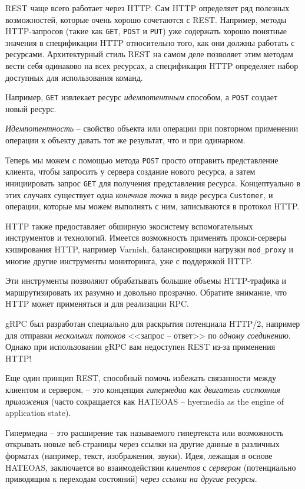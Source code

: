 \documentclass[%
	11pt,
	a4paper,
	utf8,
		]{article}
\begin{document}
REST чаще всего работает через HTTP. Сам HTTP определяет ряд полезных возможностей, которые очень хорошо сочетаются с REST. Например, методы HTTP-запросов (такие как \verb|GET|, \verb|POST| и \verb|PUT|) уже содержать хорошо понятные значения в спецификации HTTP относительно того, как они должны работать с ресурсами. Архитектурный стиль REST на самом деле позволяет этим методам вести себя одинаково на всех ресурсах, а спецификация HTTP определяет набор доступных для использования команд. 

Например, \verb|GET| извлекает ресурс \emph{идемпотентным} способом, а \verb|POST| создает новый ресурс. 

\emph{Идемпотентность} -- свойство объекта или операции при повторном применении операции к объекту давать тот же результат, что и при одинарном.

Теперь мы можем с помощью метода \verb|POST| просто отправить представление клиента, чтобы запросить у сервера создание нового ресурса, а затем инициировать запрос \verb|GET| для получения представления ресурса. Концептуально в этих случаях существует одна \emph{конечная точка} в виде ресурса \verb|Customer|, и операции, которые мы можем выполнять с ним, записываются в протокол HTTP.

HTTP также предоставляет обширную экосистему вспомогательных инструментов и технологий. Имеется возможность применять прокси-серверы кэширования HTTP, например Varnish, балансировщики нагрузки \verb|mod_proxy| и многие другие инструменты мониторинга, уже с поддержкой HTTP.

Эти инструменты позволяют обрабатывать большие объемы HTTP-трафика и маршрутизировать их разумно и довольно прозрачно. Обратите внимание, что HTTP может применяться и для реализации RPC.

gRPC был разработан специально для раскрытия потенциала HTTP/2, например для отправки \emph{нескольких потоков} <<запрос -- ответ>> по \emph{одному соединению}. Однако при использовании gRPC вам недоступен REST из-за применения HTTP!

Еще один принцип REST, способный помочь избежать связанности между клиентом и сервером, -- это концепция \emph{гипермедиа как двигатель состояния приложения} (часто сокращается как HATEOAS -- hyermedia as the engine of application state).

Гипермедиа -- это расширение так называемого гипертекста или возможность открывать новые веб-страницы через ссылки на другие данные в различных форматах (например, текст, изображения, звуки). Идея, лежащая в основе HATEOAS, заключается во взаимодействии \emph{клиентов} с \emph{сервером} (потенциально приводящим к переходам состояний) \emph{через ссылки на другие ресурсы}. 
\end{document}
